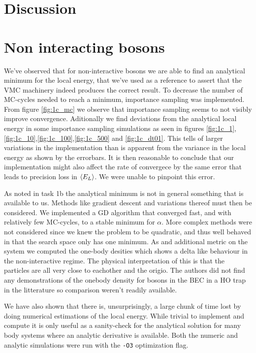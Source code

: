 \section{Discussion}
\section{Non interacting bosons}

We've observed that for non-interactive bosons we are able to find an analytical minimum for the local energy, that we've used as a reference to assert that the VMC machinery indeed produces the correct result. 
To decrease the number of MC-cycles needed to reach a minimum, importance sampling was implemented. 
From figure \ref{fig:1c_mc} we observe that importance sampling seems to not visibly improve convergence. 
Aditionally we find deviations from the analytical local energy in some importance sampling simulations as seen in figures \ref{fig:1c_1},\ref{fig:1c_10},\ref{fig:1c_100},\ref{fig:1c_500} and \ref{fig:1c_dt01}. This tells of larger variations in the implementation than is apparent from the variance in the local energy as shown by the errorbars.
It is then reasonable to conclude that our implementation might also affect the rate of convergece by the same error that leads to precision loss in $\langle E_L \rangle$. We were unable to pinpoint this error. 

As noted in task 1b the analytical minimum is not in general something that is available to us.
Methods like gradient descent and variations thereof must then be considered. We implemented a GD algorithm that converged fast, and with relatively few MC-cycles, to a stable minimum for $\alpha$. More complex methods were not considered since we knew the problem to be quadratic, and thus well behaved in that the search space only has one minimum. 
As and additional metric on the system we computed the one-body desities which shows a delta like behaviour in the non-interactive regime. The physical interpretation of this is that the particles are all very close to eachother and the origio. The authors did not find any demonstrations of the onebody density for bosons in the BEC in a HO trap in the litterature so comparison weren't readily available. 

We have also shown that there is, unsurprisingly, a large chunk of time lost by doing numerical estimations of the local energy. While trivial to implement and compute it is only useful as a sanity-check for the analytical solution for many body systems where an analytic derivative is available. Both the numeric and analytic simulations were run with the \lstinline{-O3} optimization flag. 


